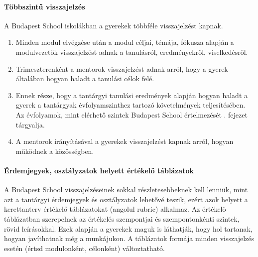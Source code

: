 \paragraph{Többszintű visszajelzés} A Budapest School iskolákban a gyerekek
többféle visszajelzést kapnak. \begin{enumerate}
      \item Minden modul elvégzése után a modul céljai, témája, fókusza alapján
            a
            modulvezetők visszajelzést adnak a tanulásról, eredményekről,
            viselkedésről.
      \item Trimeszterenként a mentorok visszajelzést adnak arról, hogy a
            gyerek
            általában hogyan haladt a tanulási célok felé.
      \item Ennek része, hogy a tantárgyi tanulási eredmények alapján hogyan
            haladt a
            gyerek a tantárgyak évfolyamszinthez tartozó követelmények
            teljesítésében. Az
            évfolyamok, mint elérhető szintek Budapest School értelmezését
            . fejezet tárgyalja.
      \item A mentorok irányításával a gyerekek visszajelzést kapnak arról,
            hogyan
            működnek a közösségben.
\end{enumerate}

\paragraph{Érdemjegyek, osztályzatok helyett értékelő táblázatok} A Budapest
School visszajelzéseinek sokkal részletesebbeknek kell lenniük, mint azt a
tantárgyi érdemjegyek és osztályzatok lehetővé teszik, ezért azok helyett a
kerettanterv
értékelő táblázatokat (angolul rubric) alkalmaz. Az értékelő táblázatban
szerepelnek az értékelés szempontjai és szempontonkénti szintek, rövid
leírásokkal.
Ezek alapján a gyerekek maguk is láthatják, hogy hol tartanak, hogyan
javíthatnak még a munkájukon. A táblázatok formája minden visszajelzés esetén
(értsd modulonként, célonként)
változtatható.